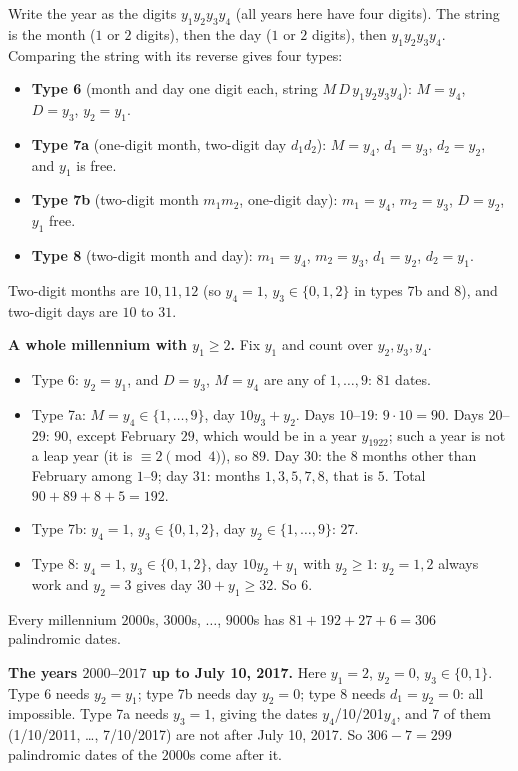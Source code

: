 Write the year as the digits $y_1y_2y_3y_4$ (all years here have four digits). The string is the month ($1$ or $2$ digits), then the day ($1$ or $2$ digits), then $y_1y_2y_3y_4$. Comparing the string with its reverse gives four types:
\begin{itemize}
\item \textbf{Type 6} (month and day one digit each, string $M\,D\,y_1y_2y_3y_4$): $M=y_4$, $D=y_3$, $y_2=y_1$.
\item \textbf{Type 7a} (one-digit month, two-digit day $d_1d_2$): $M=y_4$, $d_1=y_3$, $d_2=y_2$, and $y_1$ is free.
\item \textbf{Type 7b} (two-digit month $m_1m_2$, one-digit day): $m_1=y_4$, $m_2=y_3$, $D=y_2$, $y_1$ free.
\item \textbf{Type 8} (two-digit month and day): $m_1=y_4$, $m_2=y_3$, $d_1=y_2$, $d_2=y_1$.
\end{itemize}
Two-digit months are $10,11,12$ (so $y_4=1$, $y_3\in\{0,1,2\}$ in types 7b and 8), and two-digit days are $10$ to $31$.

\textbf{A whole millennium with $y_1\ge2$.} Fix $y_1$ and count over $y_2,y_3,y_4$.
\begin{itemize}
\item Type 6: $y_2=y_1$, and $D=y_3$, $M=y_4$ are any of $1,\dots,9$: $81$ dates.
\item Type 7a: $M=y_4\in\{1,\dots,9\}$, day $10y_3+y_2$. Days $10$--$19$: $9\cdot10=90$. Days $20$--$29$: $90$, except February $29$, which would be in a year $y_1922$; such a year is not a leap year (it is $\equiv2\pmod4$), so $89$. Day $30$: the $8$ months other than February among $1$--$9$; day $31$: months $1,3,5,7,8$, that is $5$. Total $90+89+8+5=192$.
\item Type 7b: $y_4=1$, $y_3\in\{0,1,2\}$, day $y_2\in\{1,\dots,9\}$: $27$.
\item Type 8: $y_4=1$, $y_3\in\{0,1,2\}$, day $10y_2+y_1$ with $y_2\ge1$: $y_2=1,2$ always work and $y_2=3$ gives day $30+y_1\ge32$. So $6$.
\end{itemize}
Every millennium $2000$s, $3000$s, $\dots$, $9000$s has $81+192+27+6=306$ palindromic dates.

\textbf{The years $2000$--$2017$ up to July 10, 2017.} Here $y_1=2$, $y_2=0$, $y_3\in\{0,1\}$. Type 6 needs $y_2=y_1$; type 7b needs day $y_2=0$; type 8 needs $d_1=y_2=0$: all impossible. Type 7a needs $y_3=1$, giving the dates $y_4$/10/201$y_4$, and $7$ of them (1/10/2011, \dots, 7/10/2017) are not after July 10, 2017. So $306-7=299$ palindromic dates of the $2000$s come after it.


